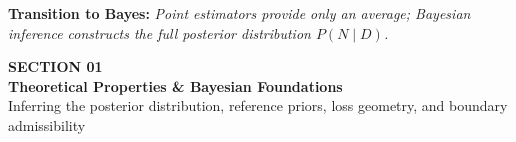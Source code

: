 \documentclass[aspectratio=169,10pt]{beamer}
\begin{document}
\begin{frame}[c]
  \vspace{0.25cm}
  \begin{center}
    {\footnotesize \textbf{\color{headernavy} Transition to Bayes: } \textit{Point estimators provide only an average; Bayesian inference constructs the full posterior distribution $P(N \mid D)$.}}
  \end{center}
\end{frame}

{
\begin{frame}[c,plain]
  \centering
  {\scriptsize \textbf{\color{accentcyan} SECTION 01}}\\[0.25cm]
  {\LARGE \textbf{\color{white} Theoretical Properties \& Bayesian Foundations}}\\[0.35cm]
  {\small \color{white!70} Inferring the posterior distribution, reference priors, loss geometry, and boundary admissibility}
\end{frame}
}
\end{document}
